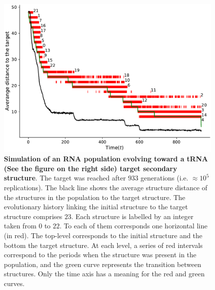 \begin{figure}[t!]
	\includegraphics[width=1.0\linewidth]{../res/images/continuity_RNAfold.pdf}
	\caption{\textbf{Simulation of an \ac{RNA} population evolving toward a tRNA (See the figure on the right side) target secondary structure}. The target was reached after $933$ generations (i.e. $\approx 10^5$ replications). The black line shows the average structure distance of the structures in the population to the target structure. The evolutionary history linking the initial structure to the target structure comprises $23$. Each structure is labelled by an integer taken from $0$ to $22$. To each of them corresponds one horizontal line (in red). The top-level corresponds to the initial structure and the bottom the target structure. At each level, a series of red intervals correspond to the periods when the structure was present in the population, and the green curve represents the transition between structures. Only the time axis has a meaning for the red and green curves. }\label{fig:contiuity}
\end{figure}
